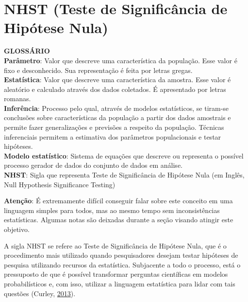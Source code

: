 \documentclass[
]{book}
\begin{document}
\hypertarget{nhst-teste-de-significuxe2ncia-de-hipuxf3tese-nula}{%
\section{NHST (Teste de Significância de Hipótese
Nula)}\label{nhst-teste-de-significuxe2ncia-de-hipuxf3tese-nula}}

\begin{glossario}
\textbf{GLOSSÁRIO}\\
\textbf{Parâmetro}: Valor que descreve uma característica da população.
Esse valor é fixo e desconhecido. Sua representação é feita por letras
gregas.\\
\textbf{Estatística}: Valor que descreve uma característica da amostra.
Esse valor é aleatório e calculado através dos dados coletados. É
apresentado por letras romanas.\\
\textbf{Inferência}: Processo pelo qual, através de modelos
estatísticos, se tiram-se conclusões sobre características da população
a partir dos dados amostrais e permite fazer generalizações e previsões
a respeito da população. Técnicas inferenciais permitem a estimativa dos
parâmetros populacionais e testar hipóteses.\\
\textbf{Modelo estatístico}: Sistema de equações que descreve ou
representa o possível processo gerador de dados do conjunto de dados em
análise.\\
\textbf{NHST}: Sigla que representa Teste de Significância de Hipótese
Nula (em Inglês, Null Hypothesis Significance Testing)
\end{glossario}

\begin{warning}

\textbf{Atenção}: É extremamente difícil conseguir falar sobre este
conceito em uma linguagem simples para todos, mas ao mesmo tempo sem
inconsistências estatísticas. Algumas notas são deixadas durante a seção
visando atingir este objetivo.

\end{warning}

A sigla NHST se refere ao Teste de Significância de Hipótese Nula, que é
o procedimento mais utilizado quando pesquisadores desejam testar
hipóteses de pesquisa utilizando recursos da estatística. Subjacente a
todo o processo, está o pressuposto de que é possível transformar
perguntas científicas em modelos probabilísticos e, com isso, utilizar a
linguagem estatística para lidar com tais questões (Curley,
\protect\hyperlink{ref-Curley013}{2013}).
\end{document}

